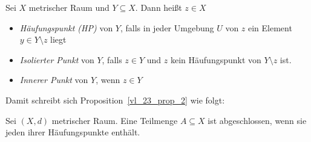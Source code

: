 \begin{Definition}{%
	Sei $X$ metrischer Raum und $Y \subseteq X$. Dann heißt $z \in X$
	\begin{itemize}
		\item \emph{Häufungspunkt (HP)} von $Y$, falls in jeder Umgebung $U$ von 
			$z$ ein Element $y \in Y \setminus z$ liegt
		\item \emph{Isolierter Punkt} von $Y$, falls $z \in Y$ und $z$ kein 
			Häufungspunkt von $Y \setminus z$ ist.
		\item \emph{Innerer Punkt} von $Y$, wenn $z \in Y$
	\end{itemize}
}\end{Definition}
Damit schreibt sich Proposition~\ref{vl_23_prop_2}
	wie folgt:
\begin{Proposition}{%
	Sei $(X,d)$ metrischer Raum. Eine Teilmenge $A \subseteq X$ ist abgeschlossen, 
	wenn sie jeden ihrer Häufungspunkte enthält.
}\end{Proposition}